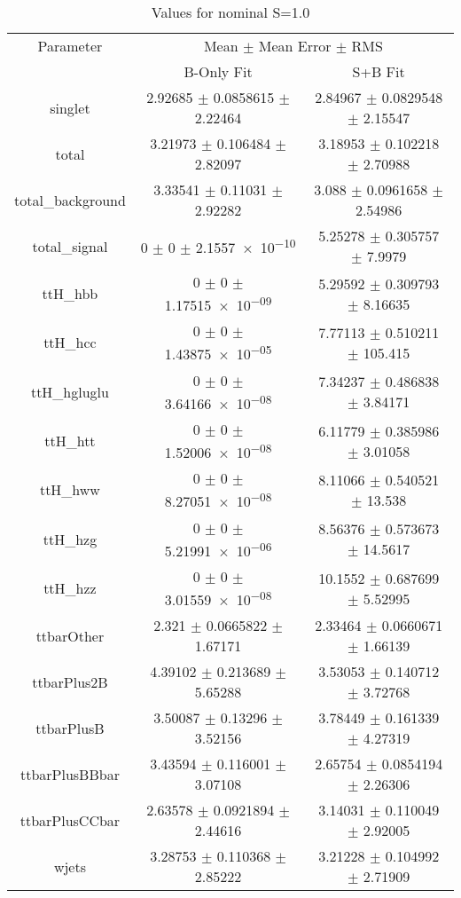 \begin{table}
\centering
\caption{Values for nominal S=1.0}
\begin{tabular}{ccc}
\toprule
Parameter & \multicolumn{2}{c}{Mean $\pm$ Mean Error $\pm$ RMS}\\
 & B-Only Fit & S+B Fit\\
\midrule
singlet & \num{2.92685} $\pm$ \num{0.0858615} $\pm$ \num{2.22464} & \num{2.84967} $\pm$ \num{0.0829548} $\pm$ \num{2.15547}\\
total & \num{3.21973} $\pm$ \num{0.106484} $\pm$ \num{2.82097} & \num{3.18953} $\pm$ \num{0.102218} $\pm$ \num{2.70988}\\
total\_background & \num{3.33541} $\pm$ \num{0.11031} $\pm$ \num{2.92282} & \num{3.088} $\pm$ \num{0.0961658} $\pm$ \num{2.54986}\\
total\_signal & \num{0} $\pm$ \num{0} $\pm$ \num{2.1557e-10} & \num{5.25278} $\pm$ \num{0.305757} $\pm$ \num{7.9979}\\
ttH\_hbb & \num{0} $\pm$ \num{0} $\pm$ \num{1.17515e-09} & \num{5.29592} $\pm$ \num{0.309793} $\pm$ \num{8.16635}\\
ttH\_hcc & \num{0} $\pm$ \num{0} $\pm$ \num{1.43875e-05} & \num{7.77113} $\pm$ \num{0.510211} $\pm$ \num{105.415}\\
ttH\_hgluglu & \num{0} $\pm$ \num{0} $\pm$ \num{3.64166e-08} & \num{7.34237} $\pm$ \num{0.486838} $\pm$ \num{3.84171}\\
ttH\_htt & \num{0} $\pm$ \num{0} $\pm$ \num{1.52006e-08} & \num{6.11779} $\pm$ \num{0.385986} $\pm$ \num{3.01058}\\
ttH\_hww & \num{0} $\pm$ \num{0} $\pm$ \num{8.27051e-08} & \num{8.11066} $\pm$ \num{0.540521} $\pm$ \num{13.538}\\
ttH\_hzg & \num{0} $\pm$ \num{0} $\pm$ \num{5.21991e-06} & \num{8.56376} $\pm$ \num{0.573673} $\pm$ \num{14.5617}\\
ttH\_hzz & \num{0} $\pm$ \num{0} $\pm$ \num{3.01559e-08} & \num{10.1552} $\pm$ \num{0.687699} $\pm$ \num{5.52995}\\
ttbarOther & \num{2.321} $\pm$ \num{0.0665822} $\pm$ \num{1.67171} & \num{2.33464} $\pm$ \num{0.0660671} $\pm$ \num{1.66139}\\
ttbarPlus2B & \num{4.39102} $\pm$ \num{0.213689} $\pm$ \num{5.65288} & \num{3.53053} $\pm$ \num{0.140712} $\pm$ \num{3.72768}\\
ttbarPlusB & \num{3.50087} $\pm$ \num{0.13296} $\pm$ \num{3.52156} & \num{3.78449} $\pm$ \num{0.161339} $\pm$ \num{4.27319}\\
ttbarPlusBBbar & \num{3.43594} $\pm$ \num{0.116001} $\pm$ \num{3.07108} & \num{2.65754} $\pm$ \num{0.0854194} $\pm$ \num{2.26306}\\
ttbarPlusCCbar & \num{2.63578} $\pm$ \num{0.0921894} $\pm$ \num{2.44616} & \num{3.14031} $\pm$ \num{0.110049} $\pm$ \num{2.92005}\\
wjets & \num{3.28753} $\pm$ \num{0.110368} $\pm$ \num{2.85222} & \num{3.21228} $\pm$ \num{0.104992} $\pm$ \num{2.71909}\\
\bottomrule
\end{tabular}
\end{table}